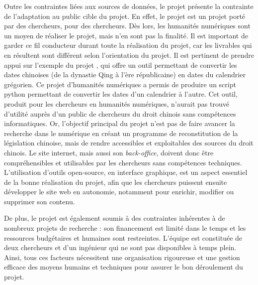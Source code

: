 Outre les contraintes liées aux sources de données, le projet présente la contrainte de l'adaptation au public cible du projet. En effet, le projet \COREL est un projet porté par des chercheurs, pour des chercheurs. Dès lors, les humanités numériques sont un moyen de réaliser le projet, mais n'en sont pas la finalité. Il est important de garder ce fil conducteur durant toute la réalisation du projet, car les livrables qui en résultent sont différent selon l'orientation du projet. Il est pertinent de prendre appui sur l'exemple du projet \calendar, qui offre un outil permettant de convertir les dates chinoises (de la dynastie Qing à l'ère républicaine) en dates du calendrier grégorien. Ce projet d'humanités numériques a permis de produire un script python permettant de convertir les dates d'un calendrier à l'autre. Cet outil, produit pour les chercheurs en humanités numériques, n'aurait pas trouvé d'utilité auprès d'un public de chercheurs du droit chinois sans compétences informatiques. Or, l'objectif principal du projet \COREL n'est pas de faire avancer la recherche dans le numérique en créant un programme de reconstitution de la législation chinoise, mais de rendre accessibles et exploitables des sources du droit chinois. Le site internet, mais aussi son \textit{back-office}, doivent donc être compréhensibles et utilisables par les chercheurs sans compétences techniques. L'utilisation d'outils open-source, en interface graphique, est un aspect essentiel de la bonne réalisation du projet, afin que les chercheurs puissent ensuite développer le site web en autonomie, notamment pour enrichir, modifier ou supprimer son contenu. 

De plus, le projet \COREL est également soumis à des contraintes inhérentes à de nombreux projets de recherche : son financement est limité dans le temps et les ressources budgétaires et humaines sont restreintes. L'équipe est constituée de deux chercheurs et d'un ingénieur qui ne sont pas disponibles à temps plein. Ainsi, tous ces facteurs nécessitent une organisation rigoureuse et une gestion efficace des moyens humains et techniques pour assurer le bon déroulement du projet. 
